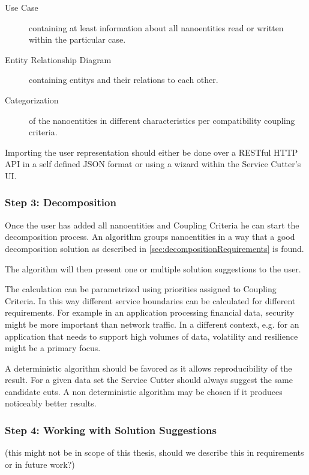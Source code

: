 \begin{description}
	\item[Use Case] containing at least information about all nanoentities read or written within the particular case. 
		\item[Entity Relationship Diagram] containing \glspl{entity} and their relations to each other. 
	\item[Categorization] of the nanoentities in different characteristics per compatibility coupling criteria. 
\end{description}

Importing the user representation should either be done over a RESTful HTTP API in a self defined JSON format or using a wizard within the Service Cutter's \gls{UI}.

\subsubsection{Step 3: Decomposition}

Once the user has added all nanoentities and Coupling Criteria he can start the decomposition process. An algorithm groups nanoentities in a way that a good decomposition solution as described in \ref{sec:decompositionRequirements} is found. 

The algorithm will then present one or multiple solution suggestions to the user.

The calculation can be parametrized using priorities assigned to Coupling Criteria. In this way different service boundaries can be calculated for different requirements. For example in an application processing financial data, security might be more important than network traffic. In a different context, e.g. for an application that needs to support high volumes of data, volatility and resilience might be a primary focus.

A deterministic algorithm should be favored as it allows reproducibility of the result. For a given data set the Service Cutter should always suggest the same candidate cuts. A non deterministic algorithm may be chosen if it produces noticeably better results.

\subsubsection{Step 4: Working with Solution Suggestions}

(this might not be in scope of this thesis, should we describe this in requirements or in future work?)

